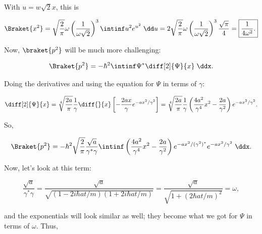 \begin{parts}
With $u = w\sqrt{2} x$, this is

\begin{equation*}
    \Braket{x^2} = \sqrt{\frac{2}{\pi}}\omega \left( \frac{1}{\omega\sqrt{2}} \right)^3 \intinf u^2 e^{u^2}\;\dd u = 2\sqrt{\frac{2}{\pi}}\omega \left( \frac{1}{\omega\sqrt{2}} \right)^3 \frac{\sqrt{\pi}}{4} = \boxed{\frac{1}{4\omega^2}.}
\end{equation*}

Now, $\braket{p^2}$ will be much more challenging:

\begin{equation*}
    \Braket{p^2} = -\hbar^2 \intinf \Psi^* \diff[2]{\Psi}{x} \;\ddx.
\end{equation*}

Doing the derivatives and using the equation for $\Psi$ in terms of $\gamma$:

\begin{equation*}
    \diff[2]{\Psi}{x} = \sqrt[4]{\frac{2a}{\pi}} \frac{1}{\gamma} \diff{}{x} \left[ -\frac{2ax}{\gamma} e^{-ax^2/\gamma^2} \right] = \sqrt[4]{\frac{2a}{\pi}} \frac{1}{\gamma} \left( \frac{4a^2}{\gamma^4}x^2 - \frac{2a}{\gamma^2} \right)e^{-ax^2/\gamma^2}.
\end{equation*}

So,

\begin{align*}
    \Braket{p^2} = -\hbar^2 \sqrt{\frac{2}{\pi}} \frac{\sqrt{a}}{\gamma^*\gamma}  \intinf \left( \frac{4a^2}{\gamma^4}x^2 - \frac{2a}{\gamma^2} \right)e^{-ax^2/(\gamma^2)^*}e^{-ax^2/\gamma^2} \;\ddx.
\end{align*}

Now, let's look at this term:

\begin{equation*}
    \frac{\sqrt{a}}{\gamma^*\gamma} = \frac{\sqrt{a}}{\sqrt{(1-2i\hbar at/m)(1+2i\hbar at/m)}} = \frac{\sqrt{a}}{\sqrt{1+(2\hbar at/m)^2}} = \omega,
\end{equation*}

and the exponentials will look similar as well; they become what we got for $\Psi$ in terms of $\omega$. Thus,


\end{parts}
